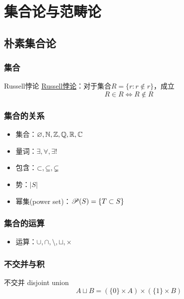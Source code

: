% 

% 
	
\chapter{集合论与范畴论}

\section{朴素集合论}

\subsection{集合}

\begin{theorem}{Russell悖论}
	\href{https://en.wikipedia.org/wiki/Russell%27s_paradox}{Russell悖论}：对于集合$R=\{r:r\notin r\}$，成立
	$$
	R\in R\iff R\notin R
	$$
\end{theorem}

\subsection{集合的关系}

\begin{itemize}
	\item 集合：$\varnothing,\mathbb{N},\mathbb{Z},\mathbb{Q},\mathbb{R},\mathbb{C}$
	\item 量词：$\exists,\forall,\exists!$
	\item 包含：$\subset,\subseteq,\subsetneq$
	\item 势：$|S|$
	\item 幂集(power set)：$\mathscr{P}(S)=\{T\subset S\}$
\end{itemize}

\subsection{集合的运算}

\begin{itemize}
	\item 运算：$\cup,\cap,\setminus,\sqcup,\times$
\end{itemize}

\subsection{不交并与积}

\begin{definition}{不交并 disjoint union}
	$$
	A\sqcup B=(\{0\}\times A)\times(\{1\}\times B)
	$$
\end{definition}

